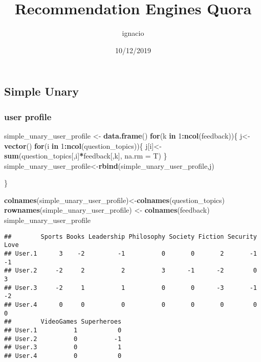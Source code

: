 \documentclass[]{article}
\title{Recommendation Engines Quora}
\author{ignacio}
\date{10/12/2019}
\newenvironment{Shaded}{\begin{snugshade}}{\end{snugshade}}
\newcommand{\ControlFlowTok}[1]{\textcolor[rgb]{0.13,0.29,0.53}{\textbf{#1}}}
\newcommand{\DataTypeTok}[1]{\textcolor[rgb]{0.13,0.29,0.53}{#1}}
\newcommand{\DecValTok}[1]{\textcolor[rgb]{0.00,0.00,0.81}{#1}}
\newcommand{\KeywordTok}[1]{\textcolor[rgb]{0.13,0.29,0.53}{\textbf{#1}}}
\newcommand{\NormalTok}[1]{#1}
\newcommand{\OperatorTok}[1]{\textcolor[rgb]{0.81,0.36,0.00}{\textbf{#1}}}
\newcommand{\StringTok}[1]{\textcolor[rgb]{0.31,0.60,0.02}{#1}}
\begin{document}
\maketitle

\hypertarget{simple-unary}{%
\subsection{Simple Unary}\label{simple-unary}}

\hypertarget{user-profile}{%
\subsubsection{user profile}\label{user-profile}}

\begin{Shaded}
\begin{Highlighting}[]
\NormalTok{simple_unary_user_profile <-}\StringTok{ }\KeywordTok{data.frame}\NormalTok{()}
\ControlFlowTok{for}\NormalTok{(k }\ControlFlowTok{in} \DecValTok{1}\OperatorTok{:}\KeywordTok{ncol}\NormalTok{(feedback))\{}
\NormalTok{  j<-}\StringTok{ }\KeywordTok{vector}\NormalTok{()}
  \ControlFlowTok{for}\NormalTok{(i }\ControlFlowTok{in} \DecValTok{1}\OperatorTok{:}\KeywordTok{ncol}\NormalTok{(question_topics))\{}
\NormalTok{    j[i]<-}\StringTok{ }\KeywordTok{sum}\NormalTok{(question_topics[,i]}\OperatorTok{*}\NormalTok{feedback[,k], }\DataTypeTok{na.rm =}\NormalTok{ T)}
\NormalTok{  \}}
\NormalTok{  simple_unary_user_profile<-}\KeywordTok{rbind}\NormalTok{(simple_unary_user_profile,j)}

\NormalTok{\}}

\KeywordTok{colnames}\NormalTok{(simple_unary_user_profile)<-}\KeywordTok{colnames}\NormalTok{(question_topics)}
\KeywordTok{rownames}\NormalTok{(simple_unary_user_profile) <-}\StringTok{ }\KeywordTok{colnames}\NormalTok{(feedback)}
\NormalTok{simple_unary_user_profile}
\end{Highlighting}
\end{Shaded}

\begin{verbatim}
##        Sports Books Leadership Philosophy Society Fiction Security Love
## User.1      3    -2         -1          0       0       2       -1   -1
## User.2     -2     2          2          3      -1      -2        0    3
## User.3     -2     1          1          0       0      -3       -1   -2
## User.4      0     0          0          0       0       0        0    0
##        VideoGames Superheroes
## User.1          1           0
## User.2          0          -1
## User.3          0           1
## User.4          0           0
\end{verbatim}
\end{document}
